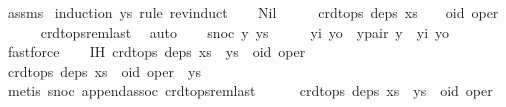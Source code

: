 \begin{isabellebody}
%
\isadelimproof
%
\endisadelimproof
%
\isatagproof
{}\isamarkupfalse%
\ assms\ \isamarkupfalse%
{\isacharparenleft}induction\ ys\ rule{\isacharcolon}\ rev{\isacharunderscore}induct{\isacharparenright}\isanewline
\ \ \isamarkupfalse%
\ Nil\isanewline
\ \ \isamarkupfalse%
\ \isamarkupfalse%
\ {\isachardoublequoteopen}crdt{\isacharunderscore}ops\ deps\ {\isacharparenleft}xs\ {\isacharat}\ {\isacharbrackleft}{\isacharbrackright}\ {\isacharat}\ {\isacharbrackleft}{\isacharparenleft}oid{\isacharcomma}\ oper{\isacharparenright}{\isacharbrackright}{\isacharparenright}{\isachardoublequoteclose}\isanewline
\ \ \ \ \isamarkupfalse%
\ crdt{\isacharunderscore}ops{\isacharunderscore}rem{\isacharunderscore}last\ \isamarkupfalse%
\ auto\isanewline
{}\isamarkupfalse%
\isanewline
\ \ \isamarkupfalse%
\ {\isacharparenleft}snoc\ y\ ys{\isacharparenright}\isanewline
\ \ \isamarkupfalse%
\ \isamarkupfalse%
\ yi\ yo\ \ y{\isacharunderscore}pair{\isacharcolon}\ {\isachardoublequoteopen}y\ {\isacharequal}\ {\isacharparenleft}yi{\isacharcomma}\ yo{\isacharparenright}{\isachardoublequoteclose}\isanewline
\ \ \ \ \isamarkupfalse%
\ fastforce\isanewline
\ \ \isamarkupfalse%
\ IH{\isacharcolon}\ {\isachardoublequoteopen}crdt{\isacharunderscore}ops\ deps\ {\isacharparenleft}xs\ {\isacharat}\ ys\ {\isacharat}\ {\isacharbrackleft}{\isacharparenleft}oid{\isacharcomma}\ oper{\isacharparenright}{\isacharbrackright}{\isacharparenright}{\isachardoublequoteclose}\isanewline
\ \ \isamarkupfalse%
\ {\isacharminus}\isanewline
\ \ \ \ \isamarkupfalse%
\ {\isachardoublequoteopen}crdt{\isacharunderscore}ops\ deps\ {\isacharparenleft}xs\ {\isacharat}\ {\isacharbrackleft}{\isacharparenleft}oid{\isacharcomma}\ oper{\isacharparenright}{\isacharbrackright}\ {\isacharat}\ ys{\isacharparenright}{\isachardoublequoteclose}\isanewline
\ \ \ \ \ \ \isamarkupfalse%
\ {\isacharparenleft}metis\ snoc{\isacharparenleft}{}{\isacharparenright}\ append{\isachardot}assoc\ crdt{\isacharunderscore}ops{\isacharunderscore}rem{\isacharunderscore}last{\isacharparenright}\isanewline
\ \ \ \ \isamarkupfalse%
\ {\isachardoublequoteopen}crdt{\isacharunderscore}ops\ deps\ {\isacharparenleft}xs\ {\isacharat}\ ys\ {\isacharat}\ {\isacharbrackleft}{\isacharparenleft}oid{\isacharcomma}\ oper{\isacharparenright}{\isacharbrackright}{\isacharparenright}{\isachardoublequoteclose}\isanewline

\end{isabellebody}
